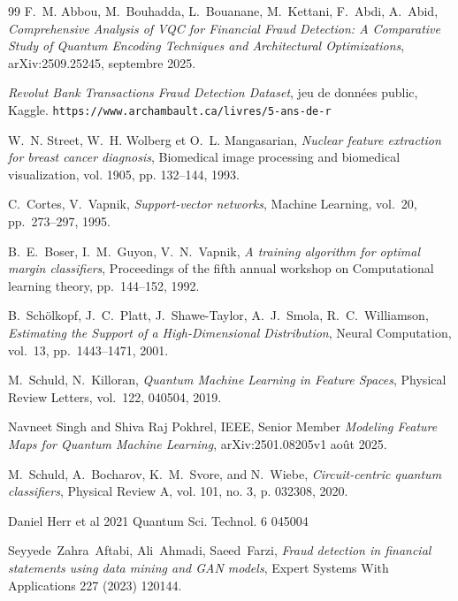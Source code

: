 \documentclass[a4paper]{article}
\begin{document}
\begin{thebibliography}{99}
 F.~M. Abbou, M.~Bouhadda, L.~Bouanane, M.~Kettani, F.~Abdi, A.~Abid, \textit{Comprehensive Analysis of VQC for Financial Fraud Detection: A Comparative Study of Quantum Encoding Techniques and Architectural Optimizations}, arXiv:2509.25245, septembre 2025.

 \textit{Revolut Bank Transactions Fraud Detection Dataset}, jeu de données public, Kaggle. \texttt{https://www.archambault.ca/livres/5-ans-de-r}%


W.~N. Street, W.~H. Wolberg et O.~L. Mangasarian, \textit{Nuclear feature extraction for breast cancer diagnosis}, Biomedical image processing and biomedical visualization, vol. 1905, pp. 132--144, 1993.

 C.~Cortes, V.~Vapnik, \textit{Support-vector networks}, Machine Learning, vol.~20, pp.~273--297, 1995.

 B.~E.~Boser, I.~M.~Guyon, V.~N.~Vapnik, \textit{A training algorithm for optimal margin classifiers}, Proceedings of the fifth annual workshop on Computational learning theory, pp.~144--152, 1992.

 B.~Schölkopf, J.~C.~Platt, J.~Shawe-Taylor, A.~J.~Smola, R.~C.~Williamson, \textit{Estimating the Support of a High-Dimensional Distribution}, Neural Computation, vol.~13, pp.~1443--1471, 2001.

 M.~Schuld, N.~Killoran, \textit{Quantum Machine Learning in Feature Spaces}, Physical Review Letters, vol.~122, 040504, 2019.

 Navneet Singh and Shiva Raj Pokhrel, IEEE, Senior Member \textit{Modeling Feature Maps for Quantum Machine
Learning}, arXiv:2501.08205v1 août 2025.

 M.~Schuld, A.~Bocharov, K.~M.~Svore, and N.~Wiebe, \textit{Circuit-centric quantum classifiers}, Physical Review A, vol. 101, no. 3, p. 032308,
2020.

 Daniel Herr et al 2021 Quantum Sci. Technol. 6 045004

 Seyyede~Zahra~Aftabi, Ali~Ahmadi, Saeed~Farzi, \textit{Fraud detection in financial statements using data mining and GAN models}, Expert Systems With Applications 227 (2023) 120144.


\end{thebibliography}
\end{document}

